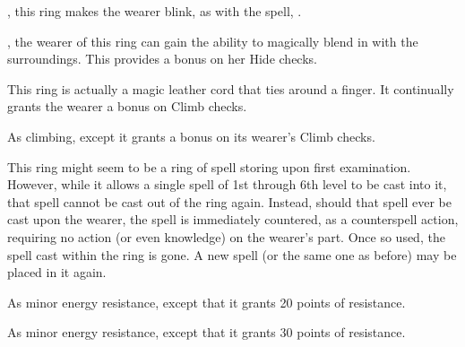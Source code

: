  , this ring makes the wearer blink, as with the  spell, . 


 , the wearer of this ring can gain the ability to magically blend in with the surroundings. This provides a   bonus on her Hide checks.


 This ring is actually a magic leather cord that ties around a finger. It continually grants the wearer a   bonus on Climb checks.


 As climbing, except it grants a   bonus on its wearer's Climb checks.


 This ring might seem to be a ring of spell storing upon first examination. However, while it allows a single spell of 1st through 6th level to be cast into it, that spell cannot be cast out of the ring again. Instead, should that spell ever be cast upon the wearer, the spell is immediately countered, as a counterspell action, requiring no action (or even knowledge) on the wearer's part. Once so used, the spell cast within the ring is gone. A new spell (or the same one as before) may be placed in it again.


 As minor energy resistance, except that it grants 20 points of resistance.


 As minor energy resistance, except that it grants 30 points of resistance.

